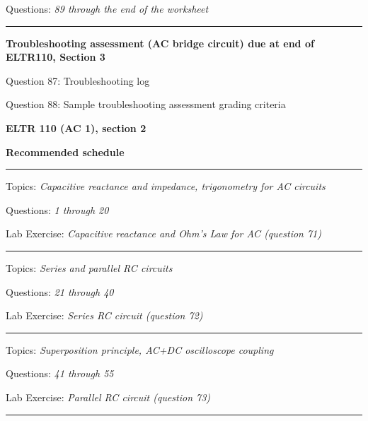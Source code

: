 \hskip 10pt Questions: {\it 89 through the end of the worksheet}
 
\vskip 10pt
\hrule \vskip 5pt
\noindent
{}

\hskip 10pt {\bf Troubleshooting assessment (AC bridge circuit) due at end of ELTR110, Section 3}
 
\hskip 10pt Question 87: Troubleshooting log
 
\hskip 10pt Question 88: Sample troubleshooting assessment grading criteria
 
\vskip 10pt







\vfil \eject

\centerline{\bf ELTR 110 (AC 1), section 2} \bigskip 
 
\vskip 10pt

\noindent
{\bf Recommended schedule}

\vskip 5pt

\hrule \vskip 5pt
\noindent
{}

\hskip 10pt Topics: {\it Capacitive reactance and impedance, trigonometry for AC circuits}
 
\hskip 10pt Questions: {\it 1 through 20}
 
\hskip 10pt Lab Exercise: {\it Capacitive reactance and Ohm's Law for AC (question 71)}
 
\vskip 10pt
\hrule \vskip 5pt
\noindent
{}

\hskip 10pt Topics: {\it Series and parallel RC circuits}
 
\hskip 10pt Questions: {\it 21 through 40}
 
\hskip 10pt Lab Exercise: {\it Series RC circuit (question 72)}
 
\vskip 10pt
\hrule \vskip 5pt
\noindent
{}

\hskip 10pt Topics: {\it Superposition principle, AC+DC oscilloscope coupling}
 
\hskip 10pt Questions: {\it 41 through 55}
 
\hskip 10pt Lab Exercise: {\it Parallel RC circuit (question 73)}
 

\vskip 10pt
\hrule \vskip 5pt
\noindent
{}


